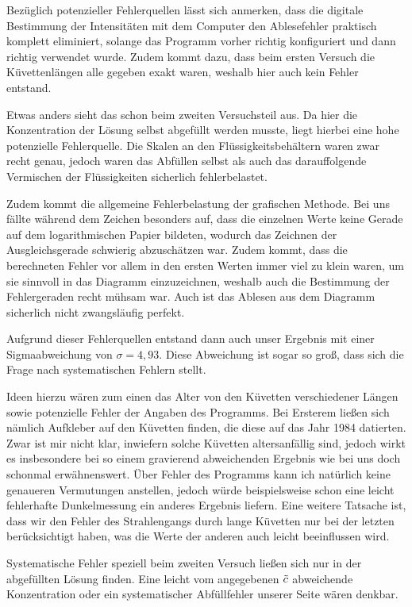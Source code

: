 \documentclass{article}
\begin{document}
Bezüglich potenzieller Fehlerquellen lässt sich anmerken, dass die digitale Bestimmung der Intensitäten mit dem Computer den Ablesefehler praktisch komplett eliminiert, solange das Programm vorher richtig konfiguriert und dann richtig verwendet wurde. Zudem kommt dazu, dass beim ersten Versuch die Küvettenlängen alle gegeben exakt waren, weshalb hier auch kein Fehler entstand. 

Etwas anders sieht das schon beim zweiten Versuchsteil aus. Da hier die Konzentration der Lösung selbst abgefüllt werden musste, liegt hierbei eine hohe potenzielle Fehlerquelle. Die Skalen an den Flüssigkeitsbehältern waren zwar recht genau, jedoch waren das Abfüllen selbst als auch das darauffolgende Vermischen der Flüssigkeiten sicherlich fehlerbelastet. 

Zudem kommt die allgemeine Fehlerbelastung der grafischen Methode. Bei uns fällte während dem Zeichen besonders auf, dass die einzelnen Werte keine Gerade auf dem logarithmischen Papier bildeten, wodurch das Zeichnen der Ausgleichsgerade schwierig abzuschätzen war. Zudem kommt, dass die berechneten Fehler vor allem in den ersten Werten immer viel zu klein waren, um sie sinnvoll in das Diagramm einzuzeichnen, weshalb auch die Bestimmung der Fehlergeraden recht mühsam war. Auch ist das Ablesen aus dem Diagramm sicherlich nicht zwangsläufig perfekt. 

Aufgrund dieser Fehlerquellen entstand dann auch unser Ergebnis mit einer Sigmaabweichung von $\sigma = 4,93$. Diese Abweichung ist sogar so groß, dass sich die Frage nach systematischen Fehlern stellt. 

Ideen hierzu wären zum einen das Alter von den Küvetten verschiedener Längen sowie potenzielle Fehler der Angaben des Programms. Bei Ersterem ließen sich nämlich Aufkleber auf den Küvetten finden, die diese auf das Jahr 1984 datierten. Zwar ist mir nicht klar, inwiefern solche Küvetten altersanfällig sind, jedoch wirkt es insbesondere bei so einem gravierend abweichenden Ergebnis wie bei uns doch schonmal erwähnenswert. Über Fehler des Programms kann ich natürlich keine genaueren Vermutungen anstellen, jedoch würde beispielsweise schon eine leicht fehlerhafte Dunkelmessung ein anderes Ergebnis liefern. Eine weitere Tatsache ist, dass wir den Fehler des Strahlengangs durch lange Küvetten nur bei der letzten berücksichtigt haben, was die Werte der anderen auch leicht beeinflussen wird. 

Systematische Fehler speziell beim zweiten Versuch ließen sich nur in der abgefüllten Lösung finden. Eine leicht vom angegebenen $\Tilde{c}$ abweichende Konzentration oder ein systematischer Abfüllfehler unserer Seite wären denkbar. 
\end{document}
